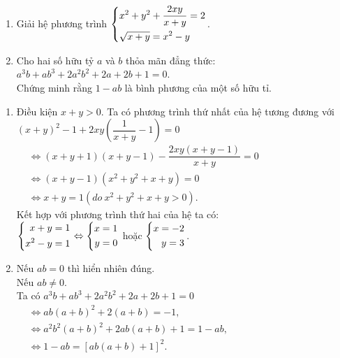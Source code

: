 \begin{ex}%
    \begin{enumerate}    
        \item Giải hệ phương trình $\left\{\begin{aligned}&x^2+ y^2+ \dfrac{2xy}{x+y}= 2\\ &\sqrt{x+y}= x^2- y\end{aligned}\right.$.     
        \item Cho hai số hữu tỷ $a$ và $b$ thỏa mãn đẳng thức:  $a^3b+ ab^3+ 2a^2b^2 +2a+ 2b+1=0$.\\
        Chứng minh rằng $1-ab$ là bình phương của một số hữu tỉ.
    \end{enumerate}
\loigiai
    {
    \begin{enumerate}
        \item Điều kiện $x+y>0$. Ta có phương trình thứ nhất của hệ tương đương với\\
         $(x+y)^2- 1+2xy\left( \dfrac{1}{x+y}- 1\right)=0$\\
         $
        \begin{aligned}
       &\Leftrightarrow (x+y+1)(x+y-1)- \dfrac{2xy(x+y-1)}{x+y}=0\\
       &\Leftrightarrow (x+y-1)(x^2+ y^2 +x+y)=0\\
       &\Leftrightarrow x+y=1 (do\ x^2+ y^2 +x+y>0).
        \end{aligned}
        $\\
        Kết hợp với phương trình thứ hai của hệ ta có:\\
        $\left\{\begin{aligned}x+y=1\\ x^2 -y= 1\end{aligned}\right. \Leftrightarrow \left\{\begin{aligned}x=1\\ y=0\end{aligned}\right.$ hoặc $\left\{\begin{aligned}x=-2\\ y= 3\end{aligned}\right.$.
        \item Nếu $ab=0$ thì hiển nhiên đúng.\\
        Nếu $ab \ne 0$.\\
        Ta có $a^3b+ ab^3+ 2a^2b^2 +2a+ 2b+1=0$\\    
        $
        \begin{aligned}
        &\Leftrightarrow ab(a+b)^2 +2(a+b)=-1,\\
        &\Leftrightarrow a^2b^2(a+b)^2+ 2ab(a+b)+1= 1-ab,\\
        &\Leftrightarrow 1-ab= [ab(a+b)+1]^2.\\
        \end{aligned}
        $
        
    \end{enumerate}
    }
\end{ex}

